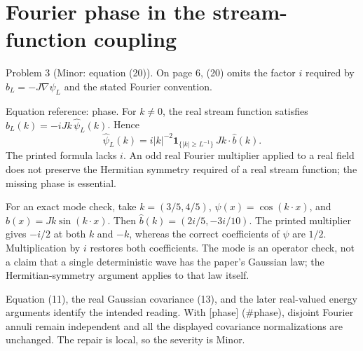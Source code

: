 \documentclass[10pt]{article}
\begin{document}
\section*{Fourier phase in the stream-function coupling}
Problem 3 (Minor: equation (20)).  On page 6, (20) omits the factor \(i\) required by \(b_L=-J\nabla\psi_L\) and the stated Fourier convention.\par
Equation reference: phase. For \(k\ne0\), the real stream function satisfies \(\widehat b_L(k)=-iJk\,\widehat\psi_L(k)\). Hence \[
 \widehat\psi_L(k)=
 i|k|^{-2}\mathbf1_{\{|k|\geq L^{-1}\}}\,Jk\cdot\widehat b(k).\] The printed formula lacks \(i\). An odd real Fourier multiplier applied to a real field does not preserve the Hermitian symmetry required of a real stream function; the missing phase is essential.\par
For an exact mode check, take \(k=(3/5,4/5)\), \(\psi(x)=\cos(k\cdot x)\), and \(b(x)=Jk\sin(k\cdot x)\). Then \(\widehat b(k)=(2i/5,-3i/10)\). The printed multiplier gives \(-i/2\) at both \(k\) and \(-k\), whereas the correct coefficients of \(\psi\) are \(1/2\). Multiplication by \(i\) restores both coefficients. The mode is an operator check, not a claim that a single deterministic wave has the paper’s Gaussian law; the Hermitian-symmetry argument applies to that law itself.\par
Equation (11), the real Gaussian covariance (13), and the later real-valued energy arguments identify the intended reading. With [phase] (\#phase), disjoint Fourier annuli remain independent and all the displayed covariance normalizations are unchanged. The repair is local, so the severity is Minor.\par
\end{document}
